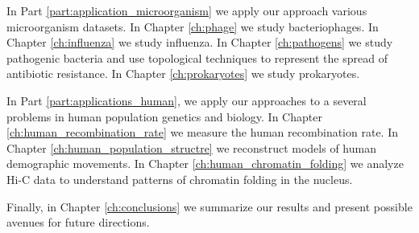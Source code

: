 In Part \ref{part:application_microorganism} we apply our approach various microorganism datasets.
In Chapter \ref{ch:phage} we study bacteriophages.
In Chapter \ref{ch:influenza} we study influenza.
In Chapter \ref{ch:pathogens} we study pathogenic bacteria and use topological techniques to represent the spread of antibiotic resistance.
In Chapter \ref{ch:prokaryotes} we study prokaryotes.

In Part \ref{part:applications_human}, we apply our approaches to a several problems in human population genetics and biology.
In Chapter \ref{ch:human_recombination_rate} we measure the human recombination rate.
In Chapter \ref{ch:human_population_structre} we reconstruct models of human demographic movements.
In Chapter \ref{ch:human_chromatin_folding} we analyze Hi-C data to understand patterns of chromatin folding in the nucleus.

Finally, in Chapter \ref{ch:conclusions} we summarize our results and present possible avenues for future directions.